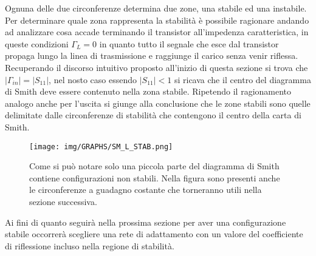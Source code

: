 \documentclass[12pt,oneside]{book}
\begin{document}
Ognuna delle due circonferenze determina due zone, una stabile ed una instabile. Per determinare quale zona rappresenta la stabilità è possibile ragionare andando ad analizzare cosa accade terminando il transistor all'impedenza caratteristica, in queste condizioni $\Gamma_{L}=0$ in quanto tutto il segnale che esce dal transistor propaga lungo la linea di trasmissione e raggiunge il carico senza venir riflessa. Recuperando il discorso intuitivo proposto all'inizio di questa sezione si trova che $|\Gamma_{in}|=|S_{11}|$, nel nosto caso essendo $|S_{11}|<1$ si ricava che il centro del diagramma di Smith deve essere contenuto nella zona stabile. Ripetendo il ragionamento analogo anche per l'uscita si giunge alla conclusione che le zone stabili sono quelle delimitate dalle circonferenze di stabilità che contengono il centro della carta di Smith.


\begin{figure}[!htbp]
    \centering
        \texttt{[image: img/GRAPHS/SM\_L\_STAB.png]}
        \caption{Come si può notare solo una piccola parte del diagramma di Smith contiene configurazioni non stabili. Nella figura sono presenti anche le circonferenze a guadagno costante che torneranno utili nella sezione successiva.}
\end{figure}

Ai fini di quanto seguirà nella prossima sezione per aver una configurazione stabile occorrerà scegliere una rete di adattamento con un valore del coefficiente di riflessione incluso nella regione di stabilità.
\end{document}
